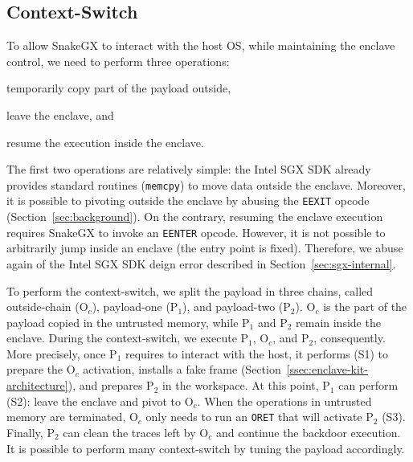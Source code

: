 \subsection{Context-Switch}
\label{ssec:switch-context}

To allow SnakeGX to interact with the host OS, while 
maintaining the enclave control,
we need to perform three operations:
\begin{enumerate*}[label=(S\arabic*)]
	\item temporarily copy part of the payload outside,
	\item leave the enclave, and
	\item resume the execution inside the enclave.
\end{enumerate*}
The first two operations are relatively simple: the Intel SGX SDK already 
provides standard routines (\eg \texttt{memcpy})
to move data outside the enclave.
Moreover, it is possible to pivoting outside the enclave by abusing the 
\texttt{EEXIT} opcode (Section~\ref{sec:background}). 
On the contrary, resuming the enclave execution requires SnakeGX to invoke
an \texttt{EENTER} opcode.
However, it is not possible to arbitrarily jump inside an enclave (\ie the 
entry point is fixed).
Therefore, we abuse again of the Intel SGX SDK deign error described in 
Section~\ref{sec:sgx-internal}.

To perform the context-switch, we split the payload in three chains, called 
outside-chain 
(O$_c$), payload-one (P$_1$), and payload-two (P$_2$).
O$_c$ is the part of the payload copied in the untrusted memory,
while P$_1$ and P$_2$ remain inside the enclave.
During the context-switch, we execute P$_1$, O$_c$, and P$_2$, 
consequently.
More precisely, once P$_1$ requires to interact with the host, it performs (S1) 
to prepare the O$_c$ activation, installs a fake frame
(Section~\ref{ssec:enclave-kit-architecture}), and prepares P$_2$ in the 
workspace.
At this point, P$_1$ can perform (S2): leave the enclave and pivot to 
O$_c$.
When the operations in untrusted memory are terminated, O$_c$ only needs to run 
an \texttt{ORET} that will activate P$_2$ (S3).
Finally, P$_2$ can clean the traces left by O$_c$ and continue the backdoor 
execution.
It is possible to perform many context-switch by tuning the payload accordingly.

